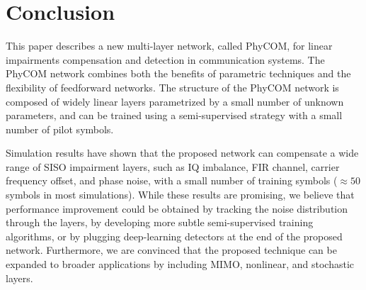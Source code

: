 \documentclass{article}
\begin{document}
\section{Conclusion}
This paper describes a new multi-layer network, called PhyCOM, for linear impairments compensation and detection in communication systems. The PhyCOM network combines both the benefits of parametric techniques and the flexibility of feedforward networks. The structure of the PhyCOM network is composed of widely linear layers parametrized by a small number of unknown parameters, and can be trained using a semi-supervised strategy with a small number of pilot symbols.

Simulation results have shown that the proposed network can compensate a wide range of SISO impairment layers, such as IQ imbalance, FIR channel, carrier frequency offset, and phase noise, with a small number of training symbols ($\approx 50$ symbols in most simulations). While these results are promising, we believe that performance improvement could be obtained by tracking the noise distribution through the layers, by developing more subtle semi-supervised training algorithms, or by plugging deep-learning detectors at the end of the proposed network. Furthermore, we are convinced that the proposed technique can be expanded to broader applications by including MIMO, nonlinear, and stochastic layers.

  

\end{document}
